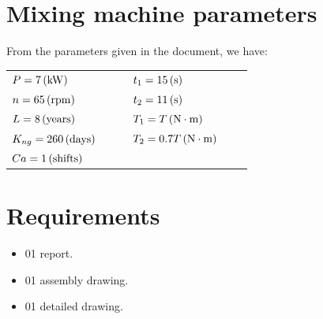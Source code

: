 \section{Mixing machine parameters}
From the parameters given in the document, we have:\\
\begin{tabular}{p{0.4\linewidth}p{0.4\linewidth}}
	$ P=7 \, (\mathrm{kW})$ & $ t_1=15\, (\mathrm{s}) $\\
	$ n=65\, (\mathrm{rpm}) $ & $ t_2=11\, (\mathrm{s}) $\\
	$ L=8\, (\mathrm{years}) $ & $ T_1=T\, (\mathrm{N\cdot m}) $\\
	$ K_{ng}=260\, (\mathrm{days}) $ & $ T_2=0.7T\, (\mathrm{N\cdot m}) $\\
	$ Ca=1\, (\mathrm{shifts}) $&\\
\end{tabular}

\section{Requirements}
\begin{itemize}
	\item 01 report.
	\item 01 assembly drawing.
	\item 01 detailed drawing.
\end{itemize}

